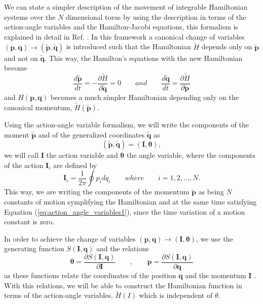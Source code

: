 We can state a simpler description of the movement of integrable Hamiltonian systems over the $N$ dimensional torus by using the description in terms of the action-angle variables and the Hamilton-Jacobi equations, this formalism is explained in detail in Ref. \cite{goldstein2002classical}. In this framework a canonical change of variables $(\bm{p},\bm{q})\rightarrow (\tilde{\bm{p}},\tilde{\bm{q}})$ is introduced such that the Hamiltonian $\tilde{H}$ depends only on $\tilde{\bm{p}}$ and not on $\tilde{\bm{q}}$. This way, the Hamilton's equations with the new Hamiltonian become
\begin{equation}
\frac{d\tilde{\bm{p}}}{dt}= -\frac{\partial \tilde{H}}{\partial \tilde{\bm{q}}}=0  \qquad and \qquad  
\frac{d\tilde{\bm{q}}}{dt}= \frac{\partial \tilde{H}}{\partial \tilde{\bm{p}}}
\label{eq:action_angle_variables1}
\end{equation}
and $H(\bm{p},\bm{q})$ becomes a much simpler Hamiltonian depending only on the canonical momentum, $\tilde{H}(\tilde{\bm{p}})$.\par


Using the action-angle variable formalism, we will write the components of the moment $\tilde{\bm{p}}$ and of the generalized coordinates $\tilde{\bm{q}}$ as
\begin{equation}
(\tilde{\bm{p}},\tilde{\bm{q}})=(\bm{I},\bm{\theta}),
\end{equation}
we will call $\bm{I}$ the action variable and $ \bm{\theta}$ the angle variable, where the components of the action $\bm{I}_i$ are defined by \cite{goldstein2002classical}
\begin{equation}
\bm{I}_i=\frac{1}{2\pi}\oint p_idq_i \qquad where \qquad i=1,2,...,N.
\end{equation}
This way, we are writing the components of the momentum $\tilde{\bm{p}}$ as being $N$ constants of motion  symplifying the Hamiltonian and at the same time satisfying Equation (\ref{eq:action_angle_variables1}), since the time variation of a motion constant is zero.\par

In order to achieve the change of variables $(\bm{p},\bm{q})\rightarrow (\bm{I},\bm{\theta})$, we use the generating function $S(\bm{I},\bm{q})$ and the relations \cite{goldstein2002classical}
\begin{equation}
\bm{\theta}=\frac{\partial S(\bm{I},\bm{q})}{\partial \bm{I}} \qquad ,\qquad \bm{p}=\frac{\partial S(\bm{I},\bm{q})}{\partial \bm{q}}
\end{equation}
as these functions relate the  coordinates of the position $\bm{q}$ and the  momentum $\bm{I}$ \cite{goldstein2002classical}. With this relations, we will be able to construct the Hamiltonian function in terms of the action-angle variables, $\tilde{H}(I)$ which is independent of $\theta$.\par

